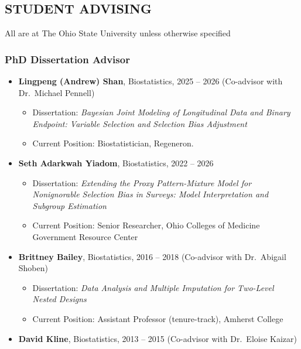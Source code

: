 \documentclass[
  english,
  letterpaper,
  DIV=11,
  numbers=noendperiod]{scrartcl}
\providecommand{\tightlist}{%
  \setlength{\itemsep}{0pt}\setlength{\parskip}{0pt}}
\begin{document}
\subsection{STUDENT ADVISING}\label{student-advising}

All are at The Ohio State University unless otherwise specified

\subsubsection{PhD Dissertation Advisor}\label{phd-dissertation-advisor}

\begin{itemize}
\tightlist
\item
  \textbf{Lingpeng (Andrew) Shan}, Biostatistics, 2025 -- 2026
  (Co-advisor with Dr.~Michael Pennell)

  \begin{itemize}
  \tightlist
  \item
    Dissertation: \emph{Bayesian Joint Modeling of Longitudinal Data and
    Binary Endpoint: Variable Selection and Selection Bias Adjustment}
  \item
    Current Position: Biostatistician, Regeneron.
  \end{itemize}
\item
  \textbf{Seth Adarkwah Yiadom}, Biostatistics, 2022 -- 2026

  \begin{itemize}
  \tightlist
  \item
    Dissertation: \emph{Extending the Proxy Pattern-Mixture Model for
    Nonignorable Selection Bias in Surveys: Model Interpretation and
    Subgroup Estimation}
  \item
    Current Position: Senior Researcher, Ohio Colleges of Medicine
    Government Resource Center
  \end{itemize}
\item
  \textbf{Brittney Bailey}, Biostatistics, 2016 -- 2018 (Co-advisor with
  Dr.~Abigail Shoben)

  \begin{itemize}
  \tightlist
  \item
    Dissertation: \emph{Data Analysis and Multiple Imputation for
    Two-Level Nested Designs}
  \item
    Current Position: Assistant Professor (tenure-track), Amherst
    College
  \end{itemize}
\item
  \textbf{David Kline}, Biostatistics, 2013 -- 2015 (Co-advisor with
  Dr.~Eloise Kaizar)


\end{itemize}
\end{document}

